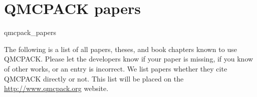 \chapter{QMCPACK papers}
\begin{btSect}{qmcpack_papers}

  The following is a list of all papers, theses, and book chapters
  known to use QMCPACK. Please let the developers know if your paper
  is missing, if you know of other works, or an entry is incorrect. We
  list papers whether they cite QMCPACK directly or not. This list
  will be placed on the \url{http://www.qmcpack.org} website.

\btPrintAll

\end{btSect}
 
